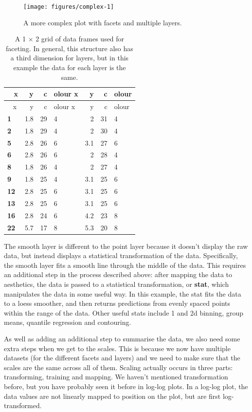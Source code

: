 \begin{figure}
\texttt{[image: figures/complex-1]} \caption{A more complex plot with facets and multiple layers.\label{fig:complex}}
\end{figure}

\begin{longtable}[c]{@{}lrrlrrl@{}}
\caption{A 1 \(\times\) 2 grid of data frames used for faceting. In
general, this structure also has a third dimension for layers, but in
this example the data for each layer is the same.}\tabularnewline
\toprule
~ x & y & c & olour x & y & c & olour\tabularnewline
\midrule
\endfirsthead
\toprule
~ x & y & c & olour x & y & c & olour\tabularnewline
\midrule
\endhead
\textbf{1} & 1.8 & 29 & 4 & 2 & 31 & 4\tabularnewline
\textbf{2} & 1.8 & 29 & 4 & 2 & 30 & 4\tabularnewline
\textbf{5} & 2.8 & 26 & 6 & 3.1 & 27 & 6\tabularnewline
\textbf{6} & 2.8 & 26 & 6 & 2 & 28 & 4\tabularnewline
\textbf{8} & 1.8 & 26 & 4 & 2 & 27 & 4\tabularnewline
\textbf{9} & 1.8 & 25 & 4 & 3.1 & 25 & 6\tabularnewline
\textbf{12} & 2.8 & 25 & 6 & 3.1 & 25 & 6\tabularnewline
\textbf{13} & 2.8 & 25 & 6 & 3.1 & 25 & 6\tabularnewline
\textbf{16} & 2.8 & 24 & 6 & 4.2 & 23 & 8\tabularnewline
\textbf{22} & 5.7 & 17 & 8 & 5.3 & 20 & 8\tabularnewline
\bottomrule
\end{longtable}

The smooth layer is different to the point layer because it doesn't
display the raw data, but instead displays a statistical transformation
of the data. Specifically, the smooth layer fits a smooth line through
the middle of the data. This requires an additional step in the process
described above: after mapping the data to aesthetics, the data is
passed to a statistical transformation, or \textbf{stat}, which
manipulates the data in some useful way. In this example, the stat fits
the data to a loess smoother, and then returns predictions from evenly
spaced points within the range of the data. Other useful stats include 1
and 2d binning, group means, quantile regression and contouring.

As well as adding an additional step to summarise the data, we also need
some extra steps when we get to the scales. This is because we now have
multiple datasets (for the different facets and layers) and we need to
make sure that the scales are the same across all of them. Scaling
actually occurs in three parts: transforming, training and mapping. We
haven't mentioned transformation before, but you have probably seen it
before in log-log plots. In a log-log plot, the data values are not
linearly mapped to position on the plot, but are first log-transformed.

